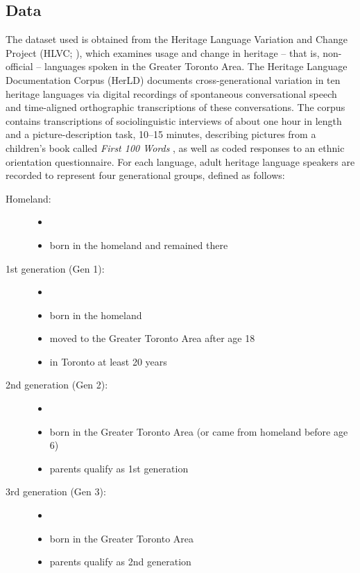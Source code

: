 \documentclass[output=paper]{langscibook}
\begin{document}
\subsection{Data}

The dataset used is obtained from the Heritage Language Variation and Change Project (HLVC; \citealp{nagy2009heritage}), which examines usage and change in  heritage -- that is, non-official -- languages spoken in the Greater Toronto Area. The Heritage Language Documentation Corpus (HerLD) documents cross-generational variation in ten heritage languages via digital recordings of spontaneous conversational speech and time-aligned orthographic transcriptions of these conversations. The corpus contains transcriptions of sociolinguistic interviews of about one hour in length and a picture-description task, 10–15 minutes, describing pictures from a children's book called \emph{First 100 Words} \citep{amery1987first}, as well as coded responses to an ethnic orientation questionnaire. For each language, adult heritage language speakers are recorded to represent four generational groups, defined as follows:\largerpage

\begin{description}
\item[Homeland:] 
\begin{itemize}
\item[]
\item born in the homeland and remained there
\end{itemize}
\item[1st generation (Gen 1):]
\begin{itemize}
 \item[]
 \item born in the homeland 
 \item moved to the Greater Toronto Area after age 18
 \item in Toronto at least 20 years
 \end{itemize}
\item[2nd generation (Gen 2):]
\begin{itemize}
  \item []
  \item born in the Greater Toronto Area (or came from homeland before age 6)
  \item parents qualify as 1st generation
  \end{itemize}
\item[3rd generation (Gen 3):]
\begin{itemize}
 \item []
 \item born in the Greater Toronto Area
 \item parents qualify as 2nd generation
 \end{itemize}
\end{description}
\end{document}
